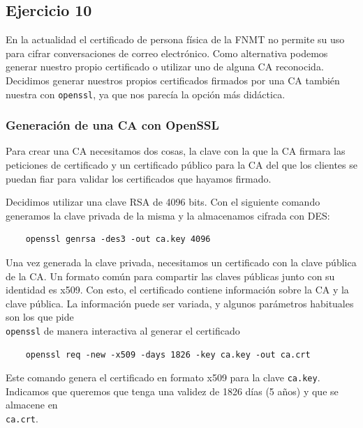 \subsection{Ejercicio 10}
\graphicspath{ {img/10} }

En la actualidad el certificado de persona física de la FNMT no permite su uso para cifrar conversaciones de correo electrónico. Como alternativa podemos generar nuestro propio certificado o utilizar uno de alguna CA reconocida. Decidimos generar nuestros propios certificados firmados por una CA también nuestra con \texttt{openssl}, ya que nos parecía la opción más didáctica.

\subsubsection{Generación de una CA con OpenSSL}

Para crear una CA necesitamos dos cosas, la clave con la que la CA firmara las peticiones de certificado y un certificado público para la CA del que los clientes se puedan fiar para validar los certificados que hayamos firmado.

Decidimos utilizar una clave RSA de 4096 bits. Con el siguiente comando generamos la clave privada de la misma y la almacenamos cifrada con DES:

\begin{verbatim}
    openssl genrsa -des3 -out ca.key 4096
\end{verbatim}

Una vez generada la clave privada, necesitamos un certificado con la clave pública de la CA. Un formato común para compartir las claves públicas junto con su identidad es x509. Con esto, el certificado contiene información sobre la CA y la clave pública. La información puede ser variada, y algunos parámetros habituales son los que pide \\\texttt{openssl} de manera interactiva al generar el certificado

\begin{verbatim}
    openssl req -new -x509 -days 1826 -key ca.key -out ca.crt
\end{verbatim}

Este comando genera el certificado en formato x509 para la clave \texttt{ca.key}. Indicamos que queremos que tenga una validez de 1826 días (5 años) y que se almacene en \\\texttt{ca.crt}.

